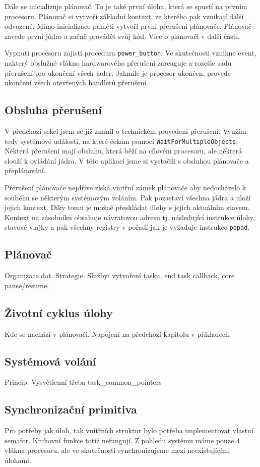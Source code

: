 \documentclass[a4paper,12pt]{article}
\begin{document}
Dále se inicializuje plánovač. To je také první úloha, která se spustí na prvním procesoru.
Plánovač si vytvoří základní kontext, ze kterého pak vznikají další odvozené. Mimo inicializace
paměti vytvoří první přerušení plánovače. Plánovač zavede první jádro a začně provádět
svůj kód. Více o plánovači v další části.

Vypnutí procesoru zajistí procedura \verb+power_button+. Ve skutečnosti vznikne event,
nakterý obslužné vlákno hardwarového přerušení zareaguje a rozešle sadu přerušení pro
ukončení všech jader. Jakmile je procesor ukončen, provede ukončení všech otevřených
handlerů přerušení.

\subsection{Obsluha přerušení}
V předchozí sekci jsem se již zmínil o technickém provedení přerušení. Využím tedy systémové
události, na které čekám pomocí \verb+WaitForMultipleObjects+. Některá přerušení mají
obsluhu, která běží na cílovém procesoru, ale některá slouží k ovládání jádra.
V této aplikaci jsme si vystačili s obsluhou plánovače a přeplánování.

Přerušení plánovače nejdříve získá vnitřní zámek plánovače aby nedocházelo k souběhu
se některým systémovým voláním. Pak pozastaví všechna jádra a uloží jejich kontext.
Díky tomu je možné přeskládat úlohy s jejich aktuálním stavem. Kontext na zásobníku
obsahuje návratovou adresu tj. následující instrukce úlohy, stavové vlajky a pak všechny
registry v pořadí jak je vyžaduje instrukce \texttt{popad}.

\subsection{Plánovač}
Organizace dat.
Strategie.
Služby: vytvoření tasku, end task callback, core pause/resume.

\subsection{Životní cyklus úlohy}
Kde se nachází v plánovači.
Napojení na předchozí kapitolu v příkladech.

\subsection{Systémová volání}
Princip.
Vysvětlenní třeba task\_common\_pointers

\subsection{Synchronizační primitiva}
Pro potřeby jak úloh, tak vnitřních struktur bylo potřeba implementovat vlastní
semafor. Knihovní funkce totiž nefungují. Z pohledu systému máme pouze 4 vlákna
procesoru, ale ve skutečnosti synchronizujeme mezi neexistujícími úlohami.
\end{document}
